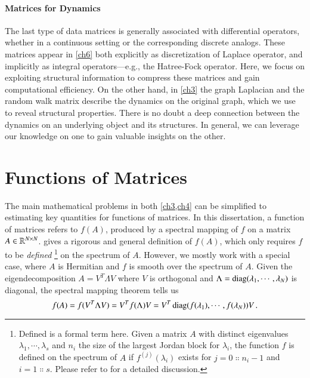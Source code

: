 \paragraph{Matrices for Dynamics}

The last type of data matrices is generally associated with differential
operators, whether in a continuous setting or the corresponding discrete
analogs. These matrices appear in \cref{ch6} both explicitly as discretization
of Laplace operator, and implicitly as integral operators---e.g., the 
Hatree\hyp{}Fock operator. Here, we focus on exploiting structural information
to compress these matrices and gain computational efficiency. On the other hand,
in \cref{ch3} the graph Laplacian and the random walk matrix describe the
dynamics on the original graph, which we use to reveal structural properties.
There is no doubt a deep connection between the dynamics on an underlying object
and its structures. In general, we can leverage our knowledge on one to gain
valuable insights on the other.

\section{Functions of Matrices}\label{pre:fom}

The main mathematical problems in both \cref{ch3,ch4} can be simplified to
estimating key quantities for functions of matrices. In this dissertation, a
function of matrices refers to $f(A)$, produced by a spectral mapping of $f$ on
a matrix $A\in\mathbb{R}^{N\mathbin{\times} N}$. \citet{higham2008functions} gives a rigorous
and general definition of $f(A)$, which only requires $f$ to be \emph{defined}
\footnote{Defined is a formal term here. Given a matrix $A$ with distinct
eigenvalues $\lambda_1,\cdots,\lambda_s$ and $n_i$ the size of the largest
Jordan block for $\lambda_i$, the function $f$ is defined on the spectrum of $A$
if $f^{(j)}(\lambda_i)$ exists for $j = 0\Colon n_i-1$ and $i = 1\Colon s$.
Please refer to \cite[Definition~1.1]{higham2008functions} for a detailed
discussion.} on the spectrum of $A$. However, we mostly work with a special
case, where $A$ is Hermitian and $f$ is smooth over the spectrum of $A$. Given
the eigendecomposition $A = V^T\Lambda V$ where $V$ is orthogonal and $\Lambda =
\operatorname{diag}(\lambda_1,\cdots,\lambda_N)$ is diagonal, the spectral mapping theorem
tells us
\begin{equation}\label{eqn:smt}
	f(A) = f(V^T\Lambda V) = V^T f(\Lambda)V = V^T\operatorname{diag}(f(\lambda_1),\cdots,f
	(\lambda_N))V\,.
\end{equation}


